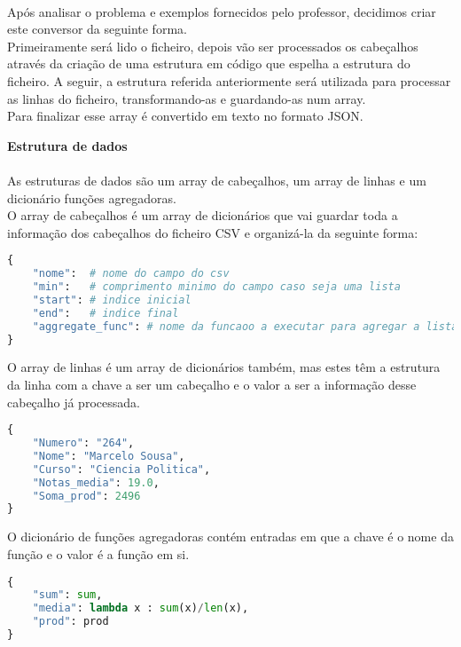 \documentclass[11pt,a4paper]{report}
\begin{document}
\paragraph{}
Após analisar o problema e exemplos fornecidos pelo professor, decidimos criar este conversor da seguinte forma. \\
Primeiramente será lido o ficheiro, depois vão ser processados os cabeçalhos através da criação de uma estrutura em código que espelha a estrutura do ficheiro. A seguir, a estrutura referida anteriormente será utilizada para processar as linhas do ficheiro, transformando-as e guardando-as num array.\\
Para finalizar esse array é convertido em texto no formato JSON.\\

\item\textbf{Estrutura de dados}
\paragraph{}
As estruturas de dados são um array de cabeçalhos, um array de linhas e um dicionário funções agregadoras.  \\
O array de cabeçalhos é um array de dicionários que vai guardar toda a informação dos cabeçalhos do  
ficheiro CSV e organizá-la da seguinte forma: \\
\begin{lstlisting}[language=Python]
{
    "nome":  # nome do campo do csv
    "min":   # comprimento minimo do campo caso seja uma lista
    "start": # indice inicial
    "end":   # indice final
    "aggregate_func": # nome da funcaoo a executar para agregar a lista
}
\end{lstlisting}

O array de linhas é um array de dicionários também, mas estes têm a estrutura da linha com a chave a ser um cabeçalho e o valor a ser a informação desse cabeçalho já processada.  \\
\begin{lstlisting}[language=Python]
{
    "Numero": "264",
    "Nome": "Marcelo Sousa",
    "Curso": "Ciencia Politica",
    "Notas_media": 19.0,
    "Soma_prod": 2496
}
\end{lstlisting}

O dicionário de funções agregadoras contém entradas em que a chave é o nome da função e o valor é a função em si. 

\begin{lstlisting}[language=Python]
{
    "sum": sum,
    "media": lambda x : sum(x)/len(x),
    "prod": prod
}
\end{lstlisting}
\end{document}
